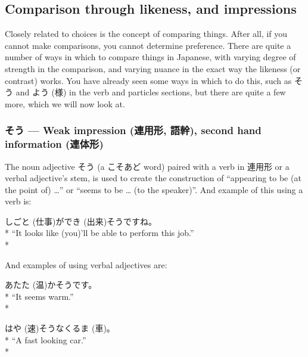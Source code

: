 \documentclass[11pt, b5paper, twoside, openright, onecolumn]{book}
\makeatletter
\newcommand*{\rubystack}[2]{{\relscale{0.5}%
  \begin{tabular}[b]{@{}c@{}}%
    {#1}\\%
   {\textscale{2}{#2}}%
  \end{tabular}}%
}
\DeclareRobustCommand*{\ruby}[2]{%
  \mbox{%
    \setlength{\parskip}{0ex}%
    \BeginAccSupp{method=pdfstringdef,ActualText={#1}}%
      \rubystack{\phantom{#2}}{#1}%
      \llap{%
        \rubystack{#2}{\phantom{#1}}%
      }%
    \EndAccSupp{}%
  }%
}
\renewcommand*{\ruby}[2]{#2 (#1)}%
\newenvironment{exampleblock}{
\setlength{\parindent}{0.6in}
\begin{minipage}[t]{\dimexpr\textwidth-\parindent}}
{\end{minipage}}
\makeatother
\begin{document}
\subsection{Comparison through likeness‚ and impressions}


Closely related to choices is the concept of comparing things. After all‚ if you cannot make comparisons‚ you cannot determine preference. There are quite a number of ways in which to compare things in Japanese‚ with varying degree of strength in the comparison‚ and varying nuance in the exact way the likeness (or contrast) works. You have already seen some ways in which to do this‚ such as そう and \ruby{様}{よう} in the verb and particles sections‚ but there are quite a few more‚ which we will now look at.

\subsubsection{そう — Weak impression (連用形‚ 語幹)‚ second hand information (連体形)}

The noun adjective そう (a こそあど word) paired with a verb in 連用形 or a verbal adjective’s stem‚ is used to create the construction of “appearing to be (at the point of) …” or “seems to be … (to the speaker)”. And example of this using a verb is:

\vspace{0.4cm}
\begin{exampleblock}
\ruby{仕事}{しごと}が\ruby{出来}{でき}そうですね。 \\* 
“It looks like (you)’ll be able to perform this job.” \\* 
\end{exampleblock}
\vspace{0.2cm}

And examples of using verbal adjectives are:

\vspace{0.4cm}
\begin{exampleblock}
\ruby{温}{あたた}かそうです。 \\* 
“It seems warm.” \\* 
\end{exampleblock}
\vspace{0.2cm}

\begin{exampleblock}
\ruby{速}{はや}そうな\ruby{車}{くるま}。 \\* 
“A fast looking car.” \\* 
\end{exampleblock}
\vspace{0.2cm}
\end{document}

